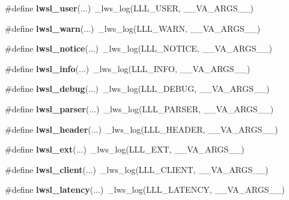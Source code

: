 \begin{DoxyCompactItemize}
\mbox{\label{group__log_ga9aad07786eb4b3189b0eac919b2a960f}} 
\#define {\bfseries lwsl\+\_\+user}(...)~\+\_\+lws\+\_\+log(L\+L\+L\+\_\+\+U\+S\+ER, \+\_\+\+\_\+\+V\+A\+\_\+\+A\+R\+G\+S\+\_\+\+\_\+)
\item 
\mbox{\label{group__log_ga1bcd293826c0a91d6e7ac3c54db72885}} 
\#define {\bfseries lwsl\+\_\+warn}(...)~\+\_\+lws\+\_\+log(L\+L\+L\+\_\+\+W\+A\+RN, \+\_\+\+\_\+\+V\+A\+\_\+\+A\+R\+G\+S\+\_\+\+\_\+)
\item 
\mbox{\label{group__log_ga86b3c56c638569eb93919c52a1d5dfaf}} 
\#define {\bfseries lwsl\+\_\+notice}(...)~\+\_\+lws\+\_\+log(L\+L\+L\+\_\+\+N\+O\+T\+I\+CE, \+\_\+\+\_\+\+V\+A\+\_\+\+A\+R\+G\+S\+\_\+\+\_\+)
\item 
\mbox{\label{group__log_gaf13957a4d9fb47c070b9320303c32502}} 
\#define {\bfseries lwsl\+\_\+info}(...)~\+\_\+lws\+\_\+log(L\+L\+L\+\_\+\+I\+N\+FO, \+\_\+\+\_\+\+V\+A\+\_\+\+A\+R\+G\+S\+\_\+\+\_\+)
\item 
\mbox{\label{group__log_ga74a1a3d4d96b146a0ac45faab0028ade}} 
\#define {\bfseries lwsl\+\_\+debug}(...)~\+\_\+lws\+\_\+log(L\+L\+L\+\_\+\+D\+E\+B\+UG, \+\_\+\+\_\+\+V\+A\+\_\+\+A\+R\+G\+S\+\_\+\+\_\+)
\item 
\mbox{\label{group__log_gaee051a14945bec746ed3b527f384dc72}} 
\#define {\bfseries lwsl\+\_\+parser}(...)~\+\_\+lws\+\_\+log(L\+L\+L\+\_\+\+P\+A\+R\+S\+ER, \+\_\+\+\_\+\+V\+A\+\_\+\+A\+R\+G\+S\+\_\+\+\_\+)
\item 
\mbox{\label{group__log_gaab72aa186eff075fb3d229cb99a35434}} 
\#define {\bfseries lwsl\+\_\+header}(...)~\+\_\+lws\+\_\+log(L\+L\+L\+\_\+\+H\+E\+A\+D\+ER, \+\_\+\+\_\+\+V\+A\+\_\+\+A\+R\+G\+S\+\_\+\+\_\+)
\item 
\mbox{\label{group__log_ga8e0877b452d80bc154793ad81bfce742}} 
\#define {\bfseries lwsl\+\_\+ext}(...)~\+\_\+lws\+\_\+log(L\+L\+L\+\_\+\+E\+XT, \+\_\+\+\_\+\+V\+A\+\_\+\+A\+R\+G\+S\+\_\+\+\_\+)
\item 
\mbox{\label{group__log_ga181ea1ed9ba604e493ce092850d9da90}} 
\#define {\bfseries lwsl\+\_\+client}(...)~\+\_\+lws\+\_\+log(L\+L\+L\+\_\+\+C\+L\+I\+E\+NT, \+\_\+\+\_\+\+V\+A\+\_\+\+A\+R\+G\+S\+\_\+\+\_\+)
\item 
\mbox{\label{group__log_gab5842ee4ec5f763d057869e083ff1cb0}} 
\#define {\bfseries lwsl\+\_\+latency}(...)~\+\_\+lws\+\_\+log(L\+L\+L\+\_\+\+L\+A\+T\+E\+N\+CY, \+\_\+\+\_\+\+V\+A\+\_\+\+A\+R\+G\+S\+\_\+\+\_\+)
\end{DoxyCompactItemize}
